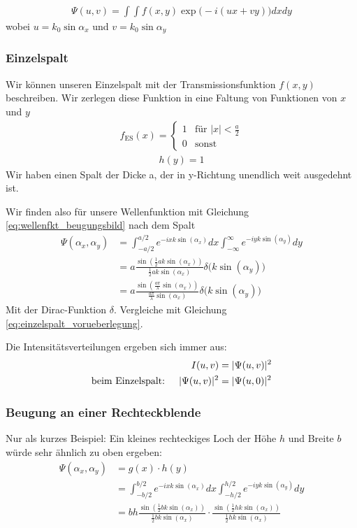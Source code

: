 \documentclass[a4paper]{article}
\begin{document}
\begin{align}
\Psi (u,v) = \int \int f(x,y) \exp\Big(-i(ux+vy)\Big) dx dy
\label{eq:wellenfkt_beugungsbild}
\end{align}
wobei $u= k_0 \sin\alpha_x$ und $v=k_0\sin\alpha_y$
\subsubsection{Einzelspalt}
Wir können unseren Einzelspalt mit der Transmissionsfunktion $f(x,y)$ beschreiben. Wir zerlegen diese Funktion in eine Faltung von Funktionen von $x$ und $y$
\begin{align}
f_\text{ES}(x) = \begin{cases} 
1  &\text{für } |x| <  \frac{a}{2} \\
0 & \text{sonst}\end{cases}
\label{eq:einzelspalt}
\end{align}
\begin{align}
h(y) = 1
\end{align}
Wir haben einen Spalt der Dicke a, der in y-Richtung unendlich weit ausgedehnt ist.

Wir finden also für unsere Wellenfunktion mit Gleichung \ref{eq:wellenfkt_beugungsbild} nach dem Spalt
\begin{align}
\Psi(\alpha_x,\alpha_y) &= \int_{-a/2}^{a/2} e^{-ixk\sin(\alpha_x)} dx \int_{-\infty}^\infty e^{-iyk\sin(\alpha_y)}dy\\
&= a \frac{\sin(\frac{1}{2} ak\sin(\alpha_x))}{\frac{1}{2} ak\sin(\alpha_x)}\delta\Big(k \sin(\alpha_y)\Big)\\
&= a \frac{\sin( \frac{a\pi}{\lambda} \sin(\alpha_x))}{\frac{a\pi}{\lambda} \sin(\alpha_x)}\delta\Big(k \sin(\alpha_y)\Big)
\end{align}
Mit der Dirac-Funktion $\delta$. Vergleiche mit Gleichung \ref{eq:einzelspalt_vorueberlegung}.

Die Intensitätsverteilungen ergeben sich immer aus:
\begin{align}
I(u,v) &= |\Psi(u,v)|^2\\
\text{beim Einzelspalt: \quad}
|\Psi(u,v)|^2 &= |\Psi(u,0)|^2 
\end{align}
\subsubsection{Beugung an einer Rechteckblende}
Nur als kurzes Beispiel: Ein kleines rechteckiges Loch der Höhe $h$ und Breite $b$ würde sehr ähnlich zu oben ergeben:
\begin{align}
\Psi(\alpha_x,\alpha_y) &= g(x) \cdot h(y) \\
&= \int_{-b/2}^{b/2} e^{-ixk\sin(\alpha_x)} dx \int_{-h/2}^{h/2} e^{-iyk\sin(\alpha_y)}dy\\
&= bh \frac{\sin(\frac{1}{2} bk\sin(\alpha_x))}{\frac{1}{2} bk\sin(\alpha_x)} \cdot \frac{\sin(\frac{1}{2} hk\sin(\alpha_x))}{\frac{1}{2} hk\sin(\alpha_x)}\\
\end{align}
\end{document}
